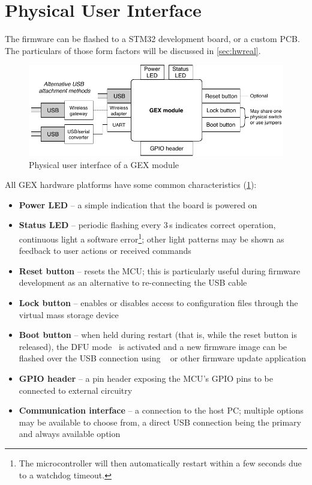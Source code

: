 \section{Physical User Interface}

The firmware can be flashed to a STM32 development board, or a custom \gls{PCB}. The particulars of those form factors will be discussed in \cref{sec:hwreal}.

\begin{figure}[h]
	\centering
	\includegraphics[scale=.95] {img/users-view.pdf}
	\caption{\label{fig:users_view_of_gex}Physical user interface of a GEX module}
\end{figure}

\noindent
All GEX hardware platforms have some common characteristics (\cref{fig:users_view_of_gex}):

\begin{itemize}	
	\item \textbf{Power \gls{LED}} -- a simple indication that the board is powered on
	\item \textbf{Status \gls{LED}} -- periodic flashing every 3\,s indicates correct operation, continuous light a software error\footnote{The microcontroller will then automatically restart within a few seconds due to a watchdog timeout.}; other light patterns may be shown as feedback to user actions or received commands
	\item \textbf{Reset button} -- resets the \gls{MCU}; this is particularly useful during firmware development as an alternative to re-connecting the \gls{USB} cable
	\item \textbf{Lock button} -- enables or disables access to configuration files through the virtual mass storage device
	\item \textbf{Boot button} -- when held during restart (that is, while the reset button is released), the \gls{DFU} mode~\cite{usbif-dfu} is activated and a new firmware image can be flashed over the \gls{USB} connection using ~\cite{dfu-util} or other firmware update application
	\item \textbf{\gls{GPIO} header} -- a pin header exposing the \gls{MCU}'s \gls{GPIO} pins to be connected to external circuitry
	\item \textbf{Communication interface} -- a connection to the host \gls{PC}; multiple options may be available to choose from, a direct \gls{USB} connection being the primary and always available option
\end{itemize}

